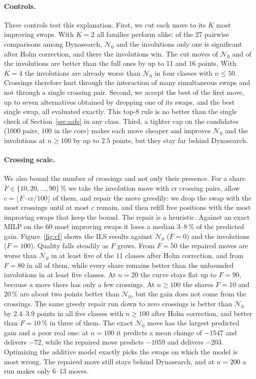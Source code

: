\documentclass[10pt,twocolumn]{article}
\newcommand{\N}{\mathcal{N}}
\begin{document}
\paragraph{Controls.} Three controls test this explanation. First, we
cut each move to its $K$ most improving swaps. With $K=2$ all families
perform alike: of the 27 pairwise comparisons among Dynasearch, $\N_0$
and the involutions only one is significant after Holm correction, and
there the involutions win. The cut moves of $\N_0$ and of the
involutions are better than the full ones by up to 11 and 16 points.
With $K=4$ the involutions are already worse than $\N_0$ in four
classes with $n\leq50$. Crossings therefore hurt through the
interaction of many simultaneous swaps and not through a single crossing
pair. Second, we accept the best of the first move, up to seven
alternatives obtained by dropping one of its swaps, and the best single
swap, all evaluated exactly. This top-8 rule is no better than the
single check of Section~\ref{sec:safe} in any class. Third, a tighter cap
on the candidates (1000 pairs, 100 in the core) makes each move cheaper
and improves $\N_0$ and the involutions at $n\geq100$ by up to $2.5$
points, but they stay far behind Dynasearch.

\paragraph{Crossing scale.} We also bound the number of crossings and
not only their presence. For a share $F\in\{10,20,\dots,90\}\,\%$ we take
the involution move with cr crossing pairs, allow
$c=\lfloor F\cdot\mathrm{cr}/100\rfloor$ of them, and repair the move
greedily: we drop the swap with the most crossings until at most $c$
remain, and then refill free positions with the most improving swaps
that keep the bound. The repair is a heuristic. Against an exact MILP on
the 60 most improving swaps it loses a median 3--8\,\% of the predicted
gain. Figure~\ref{fig:cf} shows the ILS results against $\N_0$ ($F=0$)
and the involutions ($F=100$). Quality falls steadily as $F$ grows. From
$F=50$ the repaired moves are worse than $\N_0$ in at least five of the
11 classes after Holm correction, and from $F=80$ in all of them, while
every share remains better than the unbounded involutions in at least
five classes. At $n=20$ the curve stays flat up to $F=90$, because a
move there has only a few crossings. At $n\geq100$ the shares $F=10$ and $20\,\%$ are about two points better
than $\N_0$, but the gain does not come from the crossings. The same
greedy repair run down to zero crossings is better than $\N_0$ by
2.4--3.9 points in all five classes with $n\geq100$ after Holm
correction, and better than $F=10\,\%$ in three of them. The exact $\N_0$
move has the largest predicted gain and a poor real one: at $n=100$ it
predicts a mean change of $-1547$ and delivers $-72$, while the repaired
move predicts $-1059$ and delivers $-203$. Optimizing the additive model
exactly picks the swaps on which the model is most wrong. The repaired
move still stays behind Dynasearch, and at $n=200$ a run makes only
6--13 moves.
\end{document}
